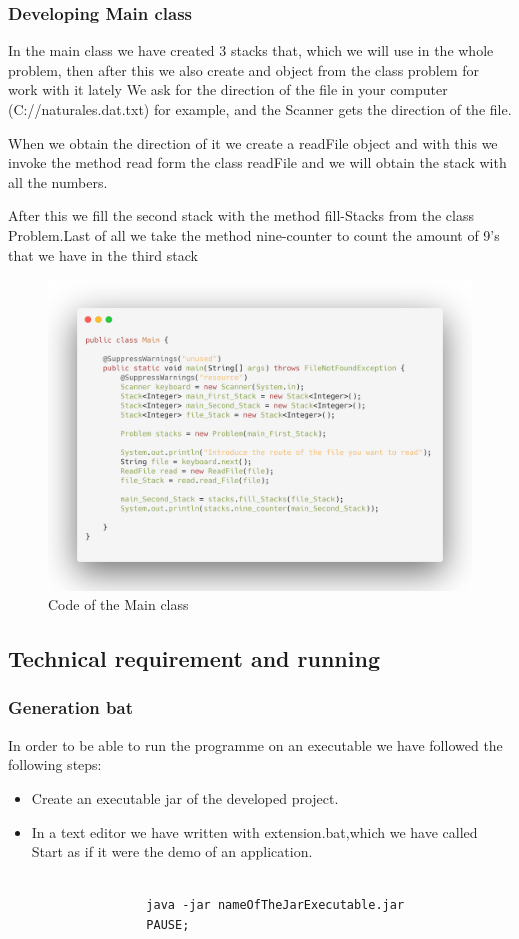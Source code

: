\documentclass[a4paper]{article}
\theoremstyle{plain}
\theoremstyle{definition}
\begin{document}
        \subsubsection{Developing Main class}
        In the main class we have created 3 stacks that, which we will use in the whole problem, then after this we also create and object from the class problem for work with it lately We ask for the direction of the file in your computer (C://naturales.dat.txt) for example, and the Scanner gets the direction of the file.\par When we obtain the direction of it we create a readFile object and with this we invoke the method read form the class readFile and we will obtain the stack with all the numbers. \par
    After this we fill the second stack with the method fill-Stacks from the class Problem.Last of all we take the method nine-counter to count the amount of 9's that we have in the third stack
        \begin{figure}[h]
            \centering
            \includegraphics[width=300pt\textwidth]{main-stacks.png}
            \caption{Code of the Main class}
             \label{fig:mesh1}
        \end{figure}
        
        
   \subsection{Technical requirement and running}
        \subsubsection{Generation bat}
        In order to be able to run the programme on an executable we have followed the following steps:
        \begin{itemize}
            \item Create an executable jar of the developed project. 
            \item In a text editor we have written with extension.bat,which we have called Start as if it were the demo of an application.
                \begin{verbatim}

                java -jar nameOfTheJarExecutable.jar
                PAUSE;

                \end{verbatim}
        \end{itemize}
\end{document}
